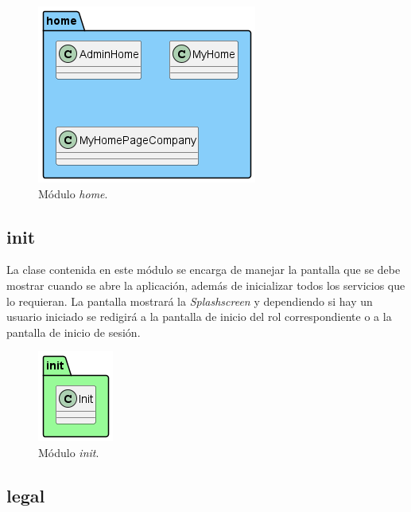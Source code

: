 \documentclass[a4paper, 12pt]{article}
\begin{document}
\begin{figure}[H]
	\begin{center}
		{\includegraphics[width=0.8\linewidth]{diagram/Home.png}\par}
		\caption{Módulo  \textit{home}.}
	\end{center}
\end{figure}


\subsection*{init}

La clase contenida en este módulo se encarga de manejar la pantalla que se debe mostrar cuando se abre la aplicación, además de inicializar todos los servicios que lo requieran. La pantalla mostrará la \textit{Splashscreen} y dependiendo si hay un usuario iniciado se redigirá a la pantalla de inicio del rol correspondiente o a la pantalla de inicio de sesión.

\begin{figure}[H]
	\begin{center}
		{\includegraphics[]{diagram/Init.png}\par}
		\caption{Módulo  \textit{init}.}
	\end{center}
\end{figure}


\subsection*{legal}
\end{document}
